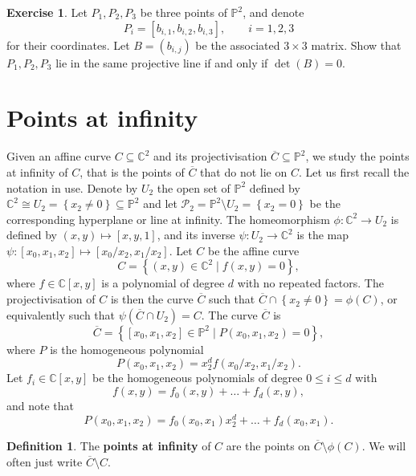 \documentclass{article}
\newcommand{\C}{\mathbb{C}}
\renewcommand{\P}{\mathbb{P}}
\newcommand{\rb}[1]{\left( #1 \right)}
\renewcommand{\sb}[1]{\left[ #1 \right]}
\newcommand{\cb}[1]{\left\{ #1 \right\}}
\theoremstyle{definition}\newtheorem{definition}{Definition}[section]
\theoremstyle{definition}\newtheorem{notation}[definition]{Notation}
\theoremstyle{definition}\newtheorem{remark}[definition]{Remark}
\theoremstyle{definition}\newtheorem{example}[definition]{Example}
\theoremstyle{definition}\newtheorem{fact}{Fact}
\theoremstyle{definition}\newtheorem{exercise}{Exercise}
\begin{document}
\begin{exercise}
\label{ex:19}
Let $ P_1, P_2, P_3 $ be three points of $ \P^2 $, and denote
$$ P_i = \sb{b_{i, 1}, b_{i, 2}, b_{i, 3}}, \qquad i = 1, 2, 3 $$
for their coordinates. Let $ B = \rb{b_{i, j}} $ be the associated $ 3 \times 3 $ matrix. Show that $ P_1, P_2, P_3 $ lie in the same projective line if and only if $ \det\rb{B} = 0 $.
\end{exercise}

\section{Points at infinity}

Given an affine curve $ C \subseteq \C^2 $ and its projectivisation $ \overline{C} \subseteq \P^2 $, we study the points at infinity of $ C $, that is the points of $ \overline{C} $ that do not lie on $ C $. Let us first recall the notation in use. Denote by $ U_2 $ the open set of $ \P^2 $ defined by $ \C^2 \cong U_2 = \cb{x_2 \ne 0} \subseteq \P^2 $ and let $ \mathcal{P}_2 = \P^2 \setminus U_2 = \cb{x_2 = 0} $ be the corresponding hyperplane or line at infinity. The homeomorphism $ \phi : \C^2 \to U_2 $ is defined by $ \rb{x, y} \mapsto \sb{x, y, 1} $, and its inverse $ \psi : U_2 \to \C^2 $ is the map $ \psi : \sb{x_0, x_1, x_2} \mapsto \sb{x_0 / x_2, x_1 / x_2} $. Let $ C $ be the affine curve
$$ C = \cb{\rb{x, y} \in \C^2 \mid f\rb{x, y} = 0}, $$
where $ f \in \C\sb{x, y} $ is a polynomial of degree $ d $ with no repeated factors. The projectivisation of $ C $ is then the curve $ \overline{C} $ such that $ \overline{C} \cap \cb{x_2 \ne 0} = \phi\rb{C} $, or equivalently such that $ \psi\rb{\overline{C} \cap U_2} = C $. The curve $ \overline{C} $ is
$$ \overline{C} = \cb{\sb{x_0, x_1, x_2} \in \P^2 \mid P\rb{x_0, x_1, x_2} = 0}, $$
where $ P $ is the homogeneous polynomial
$$ P\rb{x_0, x_1, x_2} = x_2^df\rb{x_0 / x_2, x_1 / x_2}. $$
Let $ f_i \in \C\sb{x, y} $ be the homogeneous polynomials of degree $ 0 \le i \le d $ with
$$ f\rb{x, y} = f_0\rb{x, y} + \dots + f_d\rb{x, y}, $$
and note that
$$ P\rb{x_0, x_1, x_2} = f_0\rb{x_0, x_1}x_2^d + \dots + f_d\rb{x_0, x_1}. $$

\begin{definition}
The \textbf{points at infinity} of $ C $ are the points on $ \overline{C} \setminus \phi\rb{C} $. We will often just write $ \overline{C} \setminus C $.
\end{definition}
\end{document}
